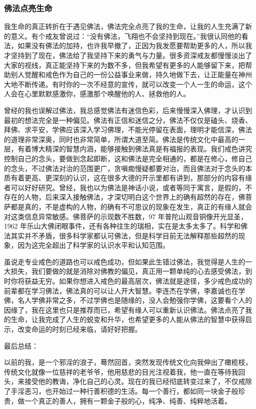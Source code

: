 \subsubsection{佛法点亮生命}

我生命的真正转折在于遇见佛法，佛法完全点亮了我的生命，让我的人生充满了新的意义。有个戒友曾说过：“没有佛法，飞翔也不会坚持到现在。”我很认同他的看法，如果没有佛法的加持，也许我早撤了，正因为我发愿要帮助更多的人，所以我才坚持到了现在，佛法给了我坚持下来的勇气与力量。很多资深戒友都慢慢淡出了大家的视线，真正能坚持下来的为数不多，但我希望有更多的人能够留下来，把帮助别人觉醒和戒色作为自己的一份公益事业来做，持久地做下去，让正能量在神州大地不断传递。有时你的一次不经意的宣传，就可以改变一个人一生的命运，这个人会在心里默默感激你，感激那个唤醒他的人、拯救他的人。

曾经的我也误解过佛法，我总感觉佛法有迷信色彩，后来慢慢深入佛理，才认识到最初的想法完全是一种偏见。佛法有正信和迷信之分，佛法不仅仅是磕头、烧香、拜佛、求平安，学佛应该深入学习佛理，不能光停留在表面，理明才能信深，佛法的道理非常深奥，同时也非常简单，所谓大道至简。佛法是传统文化中最高的一层，有着博大精深的智慧内涵，能够接触到佛法真是有福报的表现。我们戒色讲究控制自己的念头，要做到念起即断，这和佛法是完全相通的，都是在修心，修自己的念头，不过佛法对治的范围更广，贪嗔痴慢疑都要对治，而且佛法对于念头的本质有着更高、更深刻的认识，这在很多大德的开示里都有讲到，那部分的内容有缘者可以好好研究。曾经，我也以为佛法是神话小说，或者等同于寓言，是假的，不存在的人物，后来深入接触佛法，才深切明白这个世界上的确有超然的存在，佛菩萨都是真的，不是虚构的人物，的确有不可思议的现象在发生，真正的有缘人就会对这类信息异常敏感。佛菩萨的示现数不胜数，97 年普陀山观音铜像开光显圣，1962 年乐山大佛闭眼事件，还有各种往生的瑞相，实在是太多太多了。科学和佛法其实并不矛盾，很多科学家都认可佛法，但是科学目前无法解释那些超然的现象，因为这完全超出了科学家的认识水平和认知范围。

虽说走专业戒色的道路也可以戒色成功，但如果此生错过佛法，我觉得是人生的一大损失，我们要做的就是消除对佛教的偏见，真正用一颗单纯的心去感受佛法，到时你将获益无穷。如果你想进入戒色的最高层次，佛法就是途径，多少戒色成功的前辈都在学习佛法，佛法真的可以让人开大智慧。李连杰在学佛，李嘉诚也在学佛，名人学佛非常之多，不过学佛也是随缘的，没人会勉强你学佛，这要看个人的因缘了，我在这里也只是推荐而已，希望有缘人可以重新认识佛法。佛法点亮了我的生命，让我完成了人生的蜕变和升华，也希望更多的人能从佛法的智慧中获得启示，改变命运的时刻已经来临，请好好把握。

最后总结：

以前的我，是一个邪淫的浪子，蓦然回首，突然发现传统文化向我伸出了橄榄枝，传统文化就像一位慈祥的老爷爷，他用慈悲的目光注视着我，他一直在等待我回头，来接受他的教诲，净化自己的心灵。现在的我已经彻底转变过来了，不仅戒除了手淫恶习，也开始过一种行善积德的生活。每一个善行，都如同一块金子般珍贵，做一个真正的善人，拥有一颗金子般的心，纯净、纯善、纯粹地活着。

